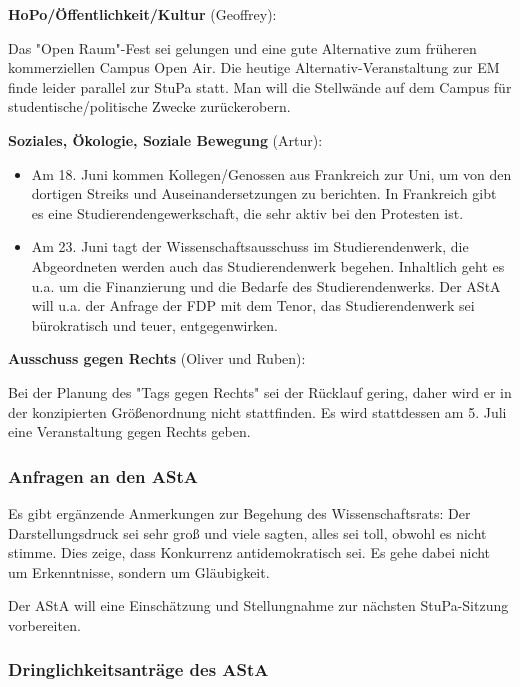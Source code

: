 \documentclass[ngerman,headheight=70pt]{scrartcl}
\begin{document}
    \textbf{HoPo/Öffentlichkeit/Kultur} (Geoffrey):

    Das "Open Raum"-Fest sei gelungen und eine gute Alternative zum früheren
    kommerziellen Campus Open Air. Die heutige Alternativ-Veranstaltung zur EM
    finde leider parallel zur StuPa statt. Man will die Stellwände auf dem Campus
    für studentische/politische Zwecke zurückerobern.

    \textbf{Soziales, Ökologie, Soziale Bewegung} (Artur):
    \begin{itemize}
        \item Am 18. Juni kommen Kollegen/Genossen aus Frankreich zur Uni, um
        von den dortigen Streiks und Auseinandersetzungen zu berichten. In Frankreich
        gibt es eine Studierendengewerkschaft, die sehr aktiv bei den Protesten
        ist.
        \item Am 23. Juni tagt der Wissenschaftsausschuss im Studierendenwerk,
        die Abgeordneten werden auch das Studierendenwerk begehen. Inhaltlich
        geht es u.a. um die Finanzierung und die Bedarfe des Studierendenwerks.
        Der AStA will u.a. der Anfrage der FDP mit dem Tenor, das
        Studierendenwerk sei bürokratisch und teuer, entgegenwirken.
    \end{itemize}

    \textbf{Ausschuss gegen Rechts} (Oliver und Ruben):

    Bei der Planung des "Tags gegen Rechts" sei der Rücklauf gering, daher wird
    er in der konzipierten Größenordnung nicht stattfinden. Es wird stattdessen
    am 5. Juli eine Veranstaltung gegen Rechts geben.

    \subsubsection{Anfragen an den AStA}

    Es gibt ergänzende Anmerkungen zur Begehung des Wissenschaftsrats: Der
    Darstellungsdruck sei sehr groß und viele sagten, alles sei toll, obwohl es
    nicht stimme. Dies zeige, dass Konkurrenz antidemokratisch sei. Es gehe dabei
    nicht um Erkenntnisse, sondern um Gläubigkeit.

    Der AStA will eine Einschätzung und Stellungnahme zur nächsten StuPa-Sitzung
    vorbereiten.

    \subsubsection{Dringlichkeitsanträge des AStA}
\end{document}
